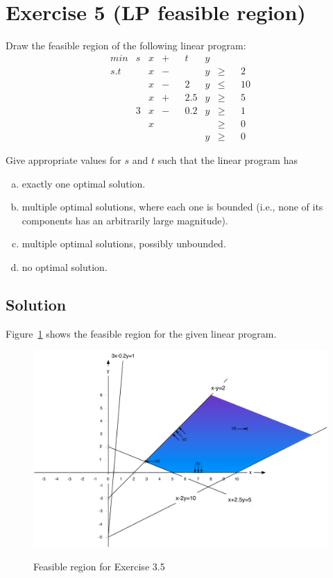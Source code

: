 \documentclass[a4paper, 12pt]{report}
\begin{document}
\section{Exercise 5 (LP feasible region)}

Draw the feasible region of the following linear program:
\begin{align*}
   & min &    s & x    & + &    & t   & y    &   &    &    &\\
   & s.t &      & x    & − &    &     & y    & ≥ &    & 2  &\\
   &     &      & x    & − &    & 2   & y    & ≤ &    & 10 &\\
   &     &      & x    & + &    & 2.5 & y    & ≥ &    & 5  &\\
   &     &    3 & x    & − &    & 0.2 & y    & ≥ &    & 1  &\\
   &     &      & x    &   &    &     &      & ≥ &    & 0  &\\
   &     &      &      &   &    &     & y    & ≥ &    & 0  &
\end{align*}

Give appropriate values for $s$ and $t$ such that the linear program has

\begin{enumerate}[(a)]
    \item exactly one optimal solution.
    \item multiple optimal solutions, where each one is bounded (i.e., none of
          its components has an arbitrarily large magnitude).
    \item multiple optimal solutions, possibly unbounded.
    \item no optimal solution.
\end{enumerate}

\subsection{Solution}

Figure~\ref{figure:Exercise_3_5_Feasible_Region} shows the feasible region for
the given linear program.

\begin{figure}[htbp]
    \caption{Feasible region for Exercise 3.5}
    \vskip 0.2cm
    \centering
    \includegraphics[width=\textwidth]{Figures/Exercise_3_5_Feasible_Region}
    \label{figure:Exercise_3_5_Feasible_Region}
\end{figure}
\end{document}
